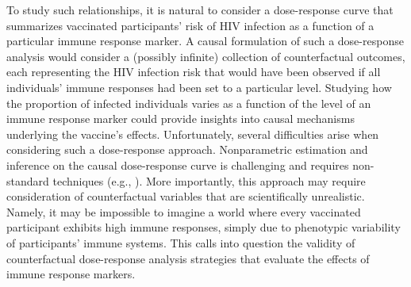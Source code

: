 To study such relationships, it is natural to consider a dose-response curve
that summarizes vaccinated participants' risk of HIV infection as a function of
a particular immune response marker. A causal formulation of such
a dose-response analysis would consider a (possibly infinite) collection of
counterfactual outcomes, each representing the HIV infection risk that would
have been observed if all individuals' immune responses had been set to
a particular level. Studying how the proportion of infected individuals varies
as a function of the level of an immune response marker could provide insights
into causal mechanisms underlying the vaccine's effects. Unfortunately, several
difficulties arise when considering such a dose-response approach. Nonparametric
estimation and inference on the causal dose-response curve is challenging and
requires non-standard techniques (e.g., \citet{ kennedy2017nonparametric}). More
importantly, this approach may require consideration of counterfactual variables
that are scientifically unrealistic. Namely, it may be impossible to imagine
a world where every vaccinated participant exhibits high immune responses,
simply due to phenotypic variability of participants' immune systems. This calls
into question the validity of counterfactual dose-response analysis strategies
that evaluate the effects of immune response markers.

